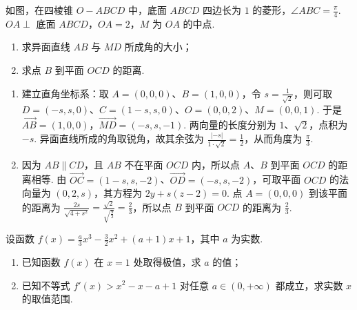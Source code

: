 \begin{problem}
如图，在四棱锥 \(O - ABCD\) 中，底面 \(ABCD\) 四边长为 \(1\) 的菱形，\(\angle ABC = \frac{\pi}{4}\). \(OA \perp\) 底面 \(ABCD\)，\(OA = 2\)，\(M\) 为 \(OA\) 的中点.

\begin{enumerate}
\item 求异面直线 \(AB\) 与 \(MD\) 所成角的大小；
\item 求点 \(B\) 到平面 \(OCD\) 的距离.
\end{enumerate}

\end{problem}

\begin{solution}
\begin{enumerate}
\item 建立直角坐标系：取 \(A=(0,0,0)\)、\(B=(1,0,0)\)，令 \(s=\frac{1}{\sqrt2}\)，则可取 \(D=(-s,s,0)\)、\(C=(1-s,s,0)\)、\(O=(0,0,2)\)、\(M=(0,0,1)\). 于是 \(\overrightarrow{AB}=(1,0,0)\)，\(\overrightarrow{MD}=(-s,s,-1)\). 两向量的长度分别为 \(1\)、\(\sqrt2\)，点积为 \(-s\). 异面直线所成的角取锐角，故其余弦为 \(\frac{|-s|}{1\cdot\sqrt2}=\frac12\)，从而角度为 \(\frac\pi3\).
\item 因为 \(AB\parallel CD\)，且 \(AB\) 不在平面 \(OCD\) 内，所以点 \(A\)、\(B\) 到平面 \(OCD\) 的距离相等. 由 \(\overrightarrow{OC}=(1-s,s,-2)\)、\(\overrightarrow{OD}=(-s,s,-2)\)，可取平面 \(OCD\) 的法向量为 \((0,2,s)\)，其方程为 \(2y+s(z-2)=0\). 点 \(A=(0,0,0)\) 到该平面的距离为 \(\frac{2s}{\sqrt{4+s^2}}=\frac{\sqrt2}{\sqrt{\frac{9}{2}}}=\frac23\)，所以点 \(B\) 到平面 \(OCD\) 的距离为 \(\frac23\).
\end{enumerate}
\end{solution}

\begin{problem}
设函数 \( f(x) = \frac{a}{3} x^3 - \frac{3}{2} x^2 + (a + 1)x + 1 \)，其中 \( a \) 为实数.

\begin{enumerate}
\item 已知函数 \(f(x)\) 在 \(x = 1\) 处取得极值，求 \(a\) 的值；
\item 已知不等式 \( f'(x) > x^2 - x - a + 1 \) 对任意 \( a \in (0, +\infty) \) 都成立，求实数 \( x \) 的取值范围.
\end{enumerate}
\end{problem}

